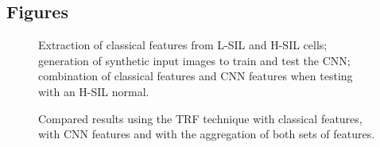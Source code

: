 \documentclass{bmcart}
\begin{document}
\begin{backmatter}


\section*{Figures}

  \begin{figure}[h!]
  \caption{
      Extraction of classical features from L-SIL and H-SIL cells; generation of synthetic input images to train and test the CNN; combination of classical features and CNN features when testing with an H-SIL normal.}
      \end{figure}

\begin{figure}[h!]
  \caption{
      Compared results using the TRF technique with classical features, with CNN features and with the aggregation of both sets of features.}
      \end{figure}



\end{backmatter}
\end{document}
